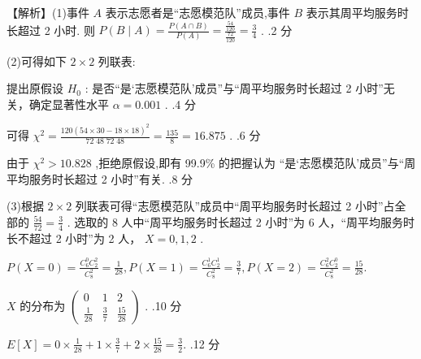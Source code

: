 \documentclass[10pt]{article}
\begin{document}
【解析】(1)事件 \(A\) 表示志愿者是“志愿模范队”成员,事件 \(B\) 表示其周平均服务时长超过 2 小时. 则 \(P\left( {B \mid  A}\right)  = \frac{P\left( {A \cap  B}\right) }{P\left( A\right) } = \frac{\frac{54}{120}}{\frac{72}{120}} = \frac{3}{4}\) . .2 分

(2)可得如下 \(2 \times  2\) 列联表:

\begin{center}
\end{center}

提出原假设 \({H}_{0}\) : 是否“是‘志愿模范队’成员”与“周平均服务时长超过 2 小时”无关，确定显著性水平 \(\alpha  = {0.001}\) . .4 分

可得 \({\chi }^{2} = \frac{{120}{\left( {54} \times  {30} - {18} \times  {18}\right) }^{2}}{{72}\;{48}\;{72}\;{48}} = \frac{135}{8} = {16.875}\) . .6 分

由于 \({\chi }^{2} > {10.828}\) ,拒绝原假设,即有 99.9\% 的把握认为 “是‘志愿模范队’成员”与“周平均服务时长超过 2 小时”有关. .8 分

(3)根据 \(2 \times  2\) 列联表可得“志愿模范队”成员中“周平均服务时长超过 2 小时”占全部的 \(\frac{54}{72} = \frac{3}{4}\) . 选取的 8 人中“周平均服务时长超过 2 小时”为 6 人，“周平均服务时长不超过 2 小时”为 2 人， \(X = 0,1,2\) .

\(P\left( {X = 0}\right)  = \frac{{C}_{6}^{0}{C}_{2}^{2}}{{C}_{8}^{2}} = \frac{1}{28},P\left( {X = 1}\right)  = \frac{{C}_{6}^{1}{C}_{2}^{1}}{{C}_{8}^{2}} = \frac{3}{7},P\left( {X = 2}\right)  = \frac{{C}_{6}^{2}{C}_{2}^{0}}{{C}_{8}^{2}} = \frac{15}{28}.\)

\(X\) 的分布为 \(\left( \begin{matrix} 0 & 1 & 2 \\  \frac{1}{28} & \frac{3}{7} & \frac{15}{28} \end{matrix}\right)\) . .10 分

\(E\left\lbrack  X\right\rbrack   = 0 \times  \frac{1}{28} + 1 \times  \frac{3}{7} + 2 \times  \frac{15}{28} = \frac{3}{2}.\) .12 分
\end{document}
